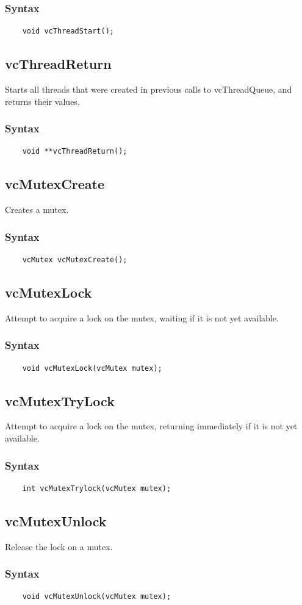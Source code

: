 \documentclass{article}
\begin{document}
\subsubsection{Syntax}
\begin{verbatim}
    void vcThreadStart();
\end{verbatim}

\subsection{vcThreadReturn}
Starts all threads that were created in previous calls to vcThreadQueue, and returns their values.
\subsubsection{Syntax}
\begin{verbatim}
    void **vcThreadReturn();
\end{verbatim}

\subsection{vcMutexCreate}
Creates a mutex.
\subsubsection{Syntax}
\begin{verbatim}
    vcMutex vcMutexCreate();
\end{verbatim}

\subsection{vcMutexLock}
Attempt to acquire a lock on the mutex, waiting if it is not yet available.
\subsubsection{Syntax}
\begin{verbatim}
    void vcMutexLock(vcMutex mutex);
\end{verbatim}

\subsection{vcMutexTryLock}
Attempt to acquire a lock on the mutex, returning immediately if it is not yet available.
\subsubsection{Syntax}
\begin{verbatim}
    int vcMutexTrylock(vcMutex mutex);
\end{verbatim}

\subsection{vcMutexUnlock}
Release the lock on a mutex.
\subsubsection{Syntax}
\begin{verbatim}
    void vcMutexUnlock(vcMutex mutex);
\end{verbatim}
\end{document}
